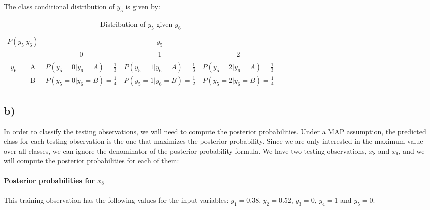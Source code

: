\documentclass{article}
\begin{document}
The class conditional distribution of $y_5$ is given by:

\begin{table}[h!]
\centering
\begin{tabular}{|cc|ccc|}
\hline
\multicolumn{2}{|c|}{\multirow{2}{*}{$P(y_5|y_6)$}} & \multicolumn{3}{c|}{$y_5$}                                                                                                        \\ \cline{3-5} 
\multicolumn{2}{|c|}{}                              & \multicolumn{1}{c|}{0}                           & \multicolumn{1}{c|}{1}                           & 2                           \\ \hline
\multicolumn{1}{|c|}{\multirow{2}{*}{$y_6$}}   & A  & \multicolumn{1}{c|}{$P(y_5=0|y_6=A) =\frac{1}{3}$} & \multicolumn{1}{c|}{$P(y_5=1|y_6=A) =\frac{1}{3}$} & $P(y_5=2|y_6=A) =\frac{1}{3}$ \\ \cline{2-5} 
\multicolumn{1}{|c|}{}                         & B  & \multicolumn{1}{c|}{$P(y_5=0|y_6=B) =\frac{1}{4}$} & \multicolumn{1}{c|}{$P(y_5=1|y_6=B) =\frac{1}{2}$} & $P(y_5=2|y_6=B) =\frac{1}{4}$ \\ \hline
\end{tabular}
\caption{Distribution of $y_5$ given $y_6$}
\end{table}

\subsection*{b)}

In order to classify the testing observations, we will need to compute the posterior probabilities. 
Under a MAP assumption, the predicted class for each testing observation is the one that maximizes the posterior probability.
Since we are only interested in the maximum value over all classes, we can ignore the denominator of the posterior probability formula.
We have two testing observations, $x_8$ and $x_9$, and we will compute the posterior probabilities for each of them:

\paragraph{Posterior probabilities for $x_8$}
\paragraph{}

This training observation has the following values for the input variables: $y_1=0.38$, $y_2=0.52$, $y_3=0$, $y_4=1$ and $y_5=0$.
\end{document}

